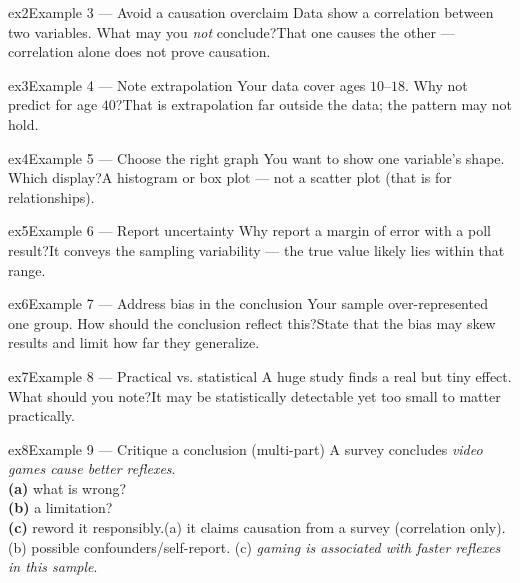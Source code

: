 \documentclass[11pt]{article}
\begin{document}
\begin{example}{ex2}{Example 3 --- Avoid a causation overclaim}
Data show a correlation between two variables. What may you \emph{not} conclude?\soln That one causes the other --- correlation alone does not prove causation.
\end{example}

\begin{example}{ex3}{Example 4 --- Note extrapolation}
Your data cover ages $10$--$18$. Why not predict for age $40$?\soln That is extrapolation far outside the data; the pattern may not hold.
\end{example}

\begin{example}{ex4}{Example 5 --- Choose the right graph}
You want to show one variable's shape. Which display?\soln A histogram or box plot --- not a scatter plot (that is for relationships).
\end{example}

\begin{example}{ex5}{Example 6 --- Report uncertainty}
Why report a margin of error with a poll result?\soln It conveys the sampling variability --- the true value likely lies within that range.
\end{example}

\begin{example}{ex6}{Example 7 --- Address bias in the conclusion}
Your sample over-represented one group. How should the conclusion reflect this?\soln State that the bias may skew results and limit how far they generalize.
\end{example}

\begin{example}{ex7}{Example 8 --- Practical vs. statistical}
A huge study finds a real but tiny effect. What should you note?\soln It may be statistically detectable yet too small to matter practically.
\end{example}

\begin{example}{ex8}{Example 9 --- Critique a conclusion (multi-part)}
A survey concludes \emph{video games cause better reflexes}. \\ \textbf{(a)} what is wrong? \\ \textbf{(b)} a limitation? \\ \textbf{(c)} reword it responsibly.\soln (a) it claims causation from a survey (correlation only). (b) possible confounders/self-report. (c) \emph{gaming is associated with faster reflexes in this sample}.
\end{example}
\end{document}
